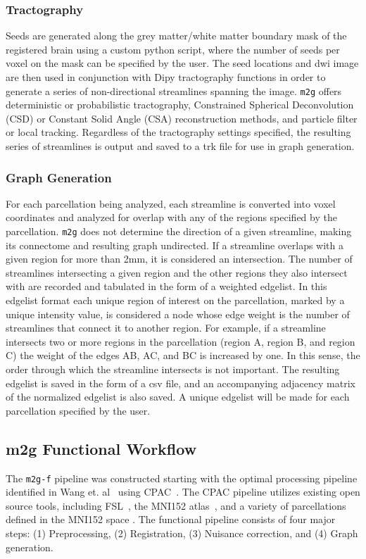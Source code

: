 \subsubsection{Tractography}
Seeds are generated along the grey matter/white matter boundary mask of the registered brain using a custom python script, where the number of seeds per voxel on the mask can be specified by the user. The seed locations and dwi image are then used in conjunction with Dipy tractography functions \cite{dipy} in order to generate a series of non-directional streamlines spanning the image. \texttt{m2g} offers deterministic or probabilistic tractography, Constrained Spherical Deconvolution (CSD) or Constant Solid Angle (CSA) reconstruction methods, and particle filter or local tracking. Regardless of the tractography settings specified, the resulting series of streamlines is output and saved to a trk file for use in graph generation.

\subsubsection{Graph Generation}
For each parcellation being analyzed, each streamline is converted into voxel coordinates and analyzed for overlap with any of the regions specified by the parcellation. \texttt{m2g} does not determine the direction of a given streamline, making its connectome and resulting graph undirected. If a streamline overlaps with a given region for more than 2mm, it is considered an intersection. The number of streamlines intersecting a given region and the other regions they also intersect with are recorded and tabulated in the form of a weighted edgelist. In this edgelist format each unique region of interest on the parcellation, marked by a unique intensity value, is considered a node whose edge weight is the number of streamlines that connect it to another region. For example, if a streamline intersects two or more regions in the parcellation (region A, region B, and region C) the weight of the edges AB, AC, and BC is increased by one. In this sense, the order through which the streamline intersects is not important. The resulting edgelist is saved in the form of a csv file, and an accompanying adjacency matrix of the normalized edgelist is also saved. A unique edgelist will be made for each parcellation specified by the user.

\subsection{m2g Functional Workflow}
The \texttt{m2g-f} pipeline was constructed starting with the optimal processing pipeline identified in Wang et. al~\cite{discriminability} using CPAC~\cite{cpac}. The CPAC pipeline utilizes existing open source tools, including FSL~\cite{fsl1,fsl2,fsl3}, the MNI152 atlas~\cite{mni152}, and a variety of parcellations defined in the MNI152 space \cite{neuroparc}. The functional pipeline consists of four major steps: (1) Preprocessing, (2) Registration, (3) Nuisance correction, and (4) Graph generation.

